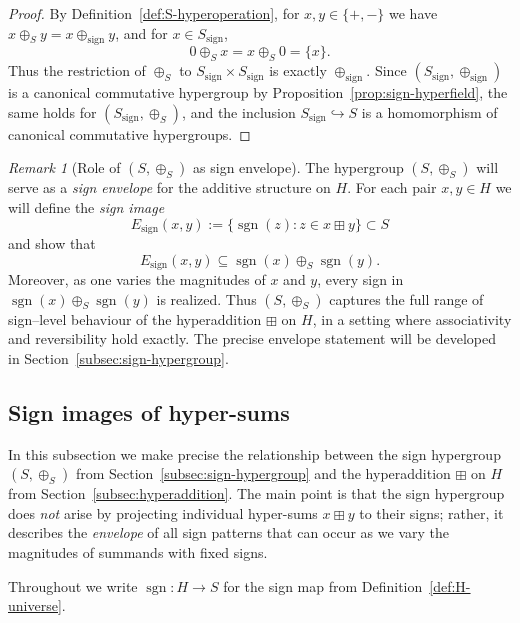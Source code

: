 \documentclass[11pt]{amsart}
\numberwithin{equation}{section}
\theoremstyle{definition}
\theoremstyle{remark}
\newtheorem{remark}[theorem]{Remark}
\newcommand{\Hnum}{H}                      %
\newcommand{\Sset}{S}                      %
\newcommand{\sgn}{\operatorname{sgn}}
\newcommand{\op}{\boxplus}                 %
\newcommand{\sop}{\oplus_S}                %
\begin{document}
\begin{proof}
By Definition~\ref{def:S-hyperoperation}, for $x,y\in\{+,-\}$ we have
$x\sop y=x\oplus_{\mathrm{sign}}y$, and for $x\in S_{\mathrm{sign}}$,
\[
  0\sop x = x\sop 0 = \{x\}.
\]
Thus the restriction of $\sop$ to $S_{\mathrm{sign}}\times
S_{\mathrm{sign}}$ is exactly $\oplus_{\mathrm{sign}}$.  Since
$(S_{\mathrm{sign}},\oplus_{\mathrm{sign}})$ is a canonical
commutative hypergroup by
Proposition~\ref{prop:sign-hyperfield}, the same holds for
$(S_{\mathrm{sign}},\sop)$, and the inclusion
$S_{\mathrm{sign}}\hookrightarrow\Sset$ is a homomorphism of
canonical commutative hypergroups.
\end{proof}

\begin{remark}[Role of $(\Sset,\sop)$ as sign envelope]
\label{rem:S-enveloping}
The hypergroup $(\Sset,\sop)$ will serve as a \emph{sign envelope} for
the additive structure on $\Hnum$.  For each pair $x,y\in\Hnum$ we
will define the \emph{sign image}
\[
  E_{\mathrm{sign}}(x,y)
  := \{\sgn(z) : z\in x\op y\}\subset\Sset
\]
and show that
\[
  E_{\mathrm{sign}}(x,y)
  \subseteq \sgn(x)\sop\sgn(y).
\]
Moreover, as one varies the magnitudes of $x$ and $y$, every sign in
$\sgn(x)\sop\sgn(y)$ is realized.  Thus $(\Sset,\sop)$ captures the
full range of sign--level behaviour of the hyperaddition $\op$ on
$\Hnum$, in a setting where associativity and reversibility hold
exactly.  The precise envelope statement will be developed in
Section~\ref{subsec:sign-hypergroup}.
\end{remark}

\subsection{Sign images of hyper-sums}
\label{subsec:sign-images}

In this subsection we make precise the relationship between the sign
hypergroup $(\Sset,\sop)$ from
Section~\ref{subsec:sign-hypergroup} and the hyperaddition $\op$ on
$\Hnum$ from Section~\ref{subsec:hyperaddition}.  The main point is
that the sign hypergroup does \emph{not} arise by projecting individual
hyper-sums $x\op y$ to their signs; rather, it describes the
\emph{envelope} of all sign patterns that can occur as we vary the
magnitudes of summands with fixed signs.

Throughout we write $\sgn:\Hnum\to\Sset$ for the sign map from
Definition~\ref{def:H-universe}.
\end{document}
